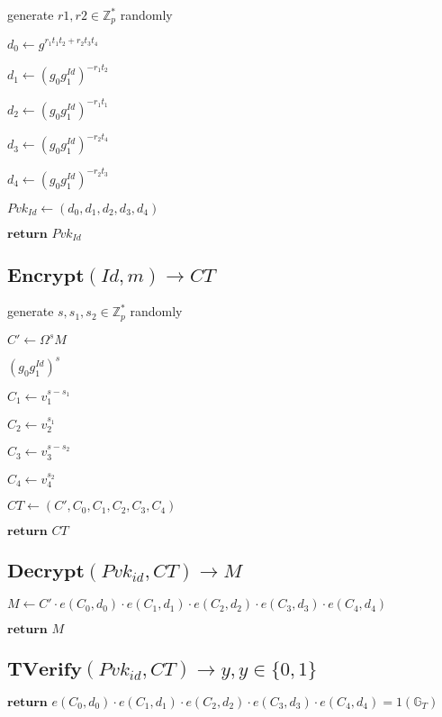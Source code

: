 \documentclass[a4paper]{article}
\begin{document}
generate $r1, r2 \in \mathbb{Z}_p^*$ randomly

$d_0 \gets g^{r_1 t_1 t_2 + r_2 t_3 t_4}$

$d_1 \gets (g_0 g_1^\textit{Id})^{-  r_1 t_2}$

$d_2 \gets (g_0 g_1^\textit{Id})^{-  r_1 t_1}$

$d_3 \gets (g_0 g_1^\textit{Id})^{-  r_2 t_4}$

$d_4 \gets (g_0 g_1^\textit{Id})^{-  r_2 t_3}$

$\textit{Pvk}_\textit{Id} \gets (d_0, d_1, d_2, d_3, d_4)$

$\textbf{return }\textit{Pvk}_\textit{Id}$

\subsection{$\textbf{Encrypt}(\textit{Id}, m) \rightarrow \textit{CT}$}

generate $s, s_1, s_2 \in \mathbb{Z}_p^*$ randomly

$C' \gets \Omega^s M$

$(g_0 g_1^\textit{Id})^s$

$C_1 \gets v_1^{s - s_1}$

$C_2 \gets v_2^{s_1}$

$C_3 \gets v_3^{s - s_2}$

$C_4 \gets v_4^{s_2}$

$\textit{CT} \gets (C', C_0, C_1, C_2, C_3, C_4)$

$\textbf{return }\textit{CT}$

\subsection{$\textbf{Decrypt}(\textit{Pvk}_\textit{id}, \textit{CT}) \rightarrow M$}

$M \gets C' \cdot e(C_0, d_0) \cdot e(C_1, d_1) \cdot e(C_2, d_2) \cdot e(C_3, d_3) \cdot e(C_4, d_4)$

$\textbf{return }M$

\subsection{$\textbf{TVerify}(\textit{Pvk}_\textit{id}, \textit{CT}) \rightarrow y, y \in \{0, 1\}$}

$\textbf{return }e(C_0, d_0) \cdot e(C_1, d_1) \cdot e(C_2, d_2) \cdot e(C_3, d_3) \cdot e(C_4, d_4) = 1 (\mathbb{G}_T)$
\end{document}
